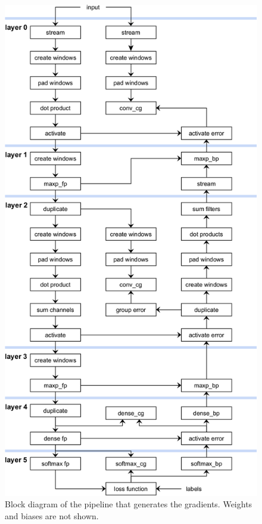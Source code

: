 \begin{figure}[H]
    \centering
        \includegraphics[height=0.95\textheight]{Images/block_diagrams/fp_bp_cg.png}
        \decoRule
        \caption[Gradients Calculation Pipeline Block Diagram]{Block diagram of the pipeline that generates the gradients. Weights and biases are not shown.}
        \label{fig: Gradients Calculation Pipeline Block Diagram}
\end{figure}

